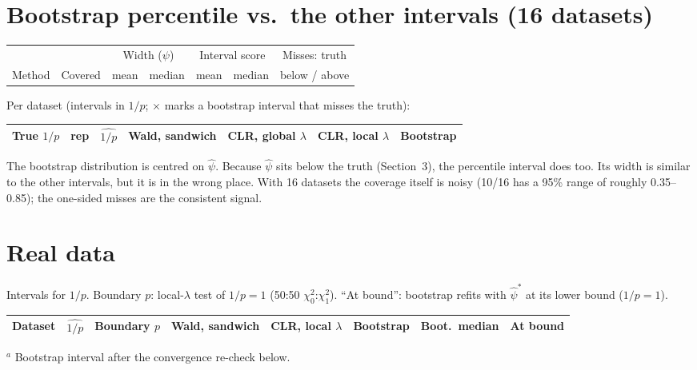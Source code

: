 \documentclass[11pt]{article}
\begin{document}
\section{Bootstrap percentile vs.\ the other intervals (16 datasets)}
\begin{center}\small
\begin{tabular}{l c cc cc c}
\toprule
& & \multicolumn{2}{c}{Width ($\psi$)} & \multicolumn{2}{c}{Interval score} & Misses: truth \\
Method & Covered & mean & median & mean & median & below / above \\
\midrule
\bottomrule
\end{tabular}
\end{center}

Per dataset (intervals in $1/p$; $\times$ marks a bootstrap interval that misses the truth):

\begin{center}\footnotesize
\setlength{\tabcolsep}{4pt}
\begin{tabular}{rr r cccc}
\toprule
True $1/p$ & rep & $\widehat{1/p}$ & Wald, sandwich & CLR, global $\lambda$ & CLR, local $\lambda$ & Bootstrap \\
\midrule
\bottomrule
\end{tabular}
\end{center}

The bootstrap distribution is centred on $\hat\psi$. Because $\hat\psi$ sits below the truth (Section~3), the percentile interval does too. Its width is similar to the other intervals, but it is in the wrong place. With 16 datasets the coverage itself is noisy (10/16 has a 95\% range of roughly 0.35--0.85); the one-sided misses are the consistent signal.

\section{Real data}
Intervals for $1/p$. Boundary $p$: local-$\lambda$ test of $1/p = 1$ (50:50 $\chi^2_0$:$\chi^2_1$). ``At bound'': bootstrap refits with $\hat\psi^*$ at its lower bound ($1/p = 1$).

\begin{center}\footnotesize
\setlength{\tabcolsep}{4pt}
\begin{tabular}{l r r c c c r r}
\toprule
Dataset & $\widehat{1/p}$ & Boundary $p$ & Wald, sandwich & CLR, local $\lambda$ & Bootstrap & Boot.\ median & At bound \\
\midrule
\bottomrule
\end{tabular}
\end{center}
{\footnotesize $^{a}$ Bootstrap interval after the convergence re-check below.}
\end{document}
